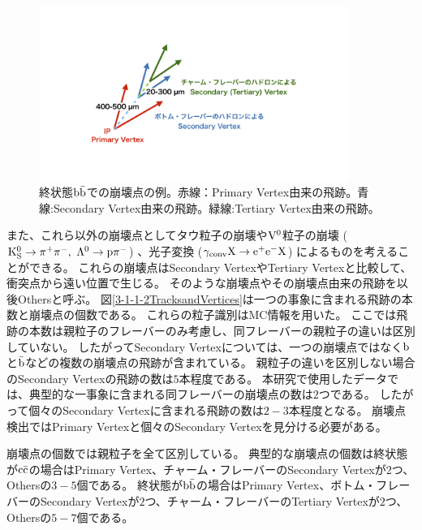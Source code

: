 \begin{figure}[htbp]
 \centering
 \includegraphics[trim = 200 200 200 200, width=0.9\textwidth, clip]{Figure/3Networks/3-1-1-1FinalStateBB.png}
 \caption[終状態$\rm b\bar{b}$での崩壊点の例]{終状態$\rm b\bar{b}$での崩壊点の例。赤線：Primary Vertex由来の飛跡。青線:Secondary Vertex由来の飛跡。緑線:Tertiary Vertex由来の飛跡。}
 \label{3-1-1-1FinalStateBB}
\end{figure}

また、これら以外の崩壊点としてタウ粒子の崩壊や$\rm V^0$粒子の崩壊 ($\rm K^0_S \to \pi^+\pi^-,\ \Lambda^0 \to p \pi^-$) 、光子変換 ($\rm \gamma_{conv} X \to e^+e^-X$) によるものを考えることができる。
これらの崩壊点はSecondary VertexやTertiary Vertexと比較して、衝突点から遠い位置で生じる。
そのような崩壊点やその崩壊点由来の飛跡を以後Othersと呼ぶ。
図\ref{3-1-1-2TracksandVertices}は一つの事象に含まれる飛跡の本数と崩壊点の個数である。
これらの粒子識別はMC情報を用いた。
ここでは飛跡の本数は親粒子のフレーバーのみ考慮し、同フレーバーの親粒子の違いは区別していない。
したがってSecondary Vertexについては、一つの崩壊点ではなく$\rm b$と$\rm \bar{b}$などの複数の崩壊点の飛跡が含まれている。
親粒子の違いを区別しない場合のSecondary Vertexの飛跡の数は$5$本程度である。
本研究で使用したデータでは、典型的な一事象に含まれる同フレーバーの崩壊点の数は$2$つである。
したがって個々のSecondary Vertexに含まれる飛跡の数は$2-3$本程度となる。
崩壊点検出ではPrimary Vertexと個々のSecondary Vertexを見分ける必要がある。

崩壊点の個数では親粒子を全て区別している。
典型的な崩壊点の個数は終状態が$\rm c\bar{c}$の場合はPrimary Vertex、チャーム・フレーバーのSecondary Vertexが$2$つ、Othersの$3-5$個である。
終状態が$\rm b\bar{b}$の場合はPrimary Vertex、ボトム・フレーバーのSecondary Vertexが$2$つ、チャーム・フレーバーのTertiary Vertexが$2$つ、Othersの$5-7$個である。

